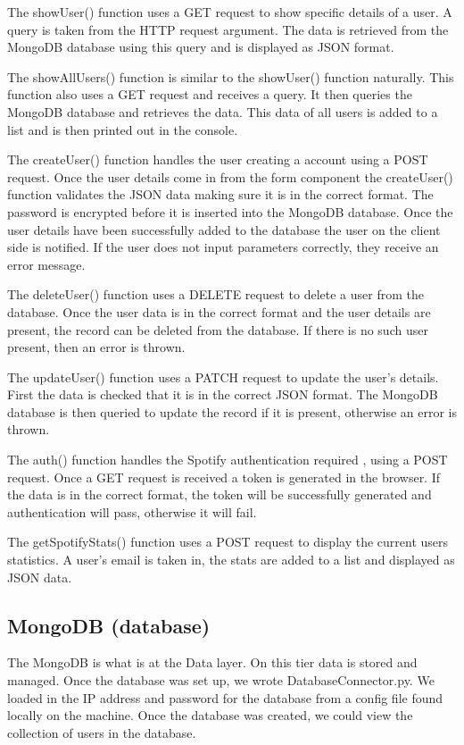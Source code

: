 The showUser() function uses a GET request to show specific details of a user. A query is taken from the HTTP request argument. The data is retrieved from the MongoDB database using this query and is displayed as JSON format.

The showAllUsers() function is similar to the showUser() function  naturally. This function also uses a GET request and receives a query. It then queries the MongoDB database and retrieves the data. This data of all users is added to a list and is then printed out in the console.

The createUser() function handles the user creating a account using a POST request. Once the user details come in from the form component the createUser() function validates the JSON data making sure it is in the correct format. The password is encrypted before it is inserted into the MongoDB database. Once the user details have been successfully added to the database the user on the client side is notified. If the user does not input parameters correctly, they receive an error message.

The deleteUser() function uses a DELETE request to delete a user from the database. Once the user data is in the correct format and the user details are present, the record can be deleted from the database. If there is no such user present, then an error is thrown.

The updateUser() function uses a PATCH request to update the user’s details. First the data is checked that it is in the correct JSON format. The MongoDB database is then queried to update the record if it is present, otherwise an error is thrown.

The auth() function handles the Spotify authentication required , using a POST request. Once a GET request is received a token is generated in the browser. If the data is in the correct format, the token will be successfully generated and authentication will pass, otherwise it will fail.

The getSpotifyStats() function uses a POST request to display the current users statistics. A user’s email is taken in, the stats are added to a list and displayed as JSON data.


\subsection{MongoDB (database)}
The MongoDB is what is at the Data layer. On this tier data is stored and managed. Once the database was set up, we wrote DatabaseConnector.py. We loaded in the IP address and password for the database from a config file found locally on the machine. Once the database was created, we could view the collection of users in the database.

